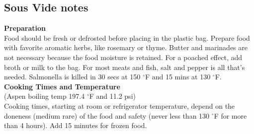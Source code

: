 \documentclass{article}
\numberwithin{figure}{section}
\numberwithin{equation}{section}
\begin{document}
\pagebreak
\subsection{Sous Vide notes}
{\bf Preparation}\\
Food should be fresh or defrosted before placing in the plastic bag. Prepare food with favorite aromatic herbs, like rosemary or thyme. Butter and marinades are not necessary because the food moisture is retained. For a poached effect, add broth or milk to the bag. For most meats and fish, salt and pepper is all that's needed. Salmonella is killed in 30 secs at 150 $^{\circ}$F and 15 mins at 130 $^{\circ}$F.\\

{\bf Cooking Times and Temperature}\\
(Aspen boiling temp 197.4 $^{\circ}$F and 11.2 psi)\\
Cooking times, starting at room or refrigerator temperature, depend on the doneness (medium rare) of the food and safety (never less than 130 $^{\circ}$F for more than 4 hours). Add 15 minutes for frozen food.
\end{document}
